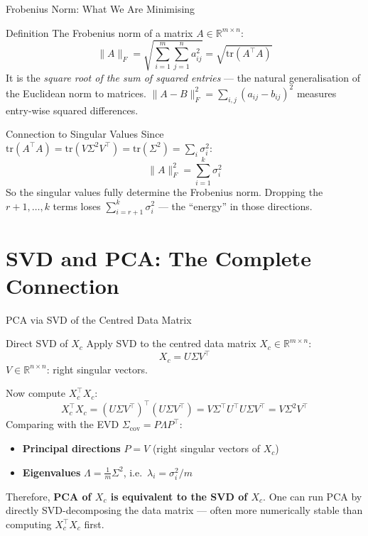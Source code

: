 \documentclass{beamer}
\begin{document}
\begin{frame}[shrink=10]{Frobenius Norm: What We Are Minimising}
  \begin{block}{Definition}
    The Frobenius norm of a matrix $A \in \mathbb{R}^{m \times n}$:
    \[
      \|A\|_F = \sqrt{\sum_{i=1}^m\sum_{j=1}^n a_{ij}^2}
              = \sqrt{\mathrm{tr}(A^\top A)}
    \]
    It is the \emph{square root of the sum of squared entries} ---
    the natural generalisation of the Euclidean norm to matrices.
    $\|A - B\|_F^2 = \sum_{i,j}(a_{ij} - b_{ij})^2$ measures
    entry-wise squared differences.
  \end{block}

  \begin{block}{Connection to Singular Values}
    Since $\mathrm{tr}(A^\top A) = \mathrm{tr}(V\Sigma^2 V^\top)
    = \mathrm{tr}(\Sigma^2) = \sum_i \sigma_i^2$:
    \[
      \|A\|_F^2 = \sum_{i=1}^k \sigma_i^2
    \]
    So the singular values fully determine the Frobenius norm.
    Dropping the $r+1,\ldots,k$ terms loses
    $\sum_{i=r+1}^k \sigma_i^2$ --- the ``energy'' in those directions.
  \end{block}
\end{frame}

\section{SVD and PCA: The Complete Connection}

\begin{frame}[shrink=10]{PCA via SVD of the Centred Data Matrix}
  \begin{block}{Direct SVD of $X_c$}
    Apply SVD to the centred data matrix $X_c \in \mathbb{R}^{m\times n}$:
    \[
      X_c = U\Sigma V^\top
    \]
    $V \in \mathbb{R}^{n \times n}$: right singular vectors.

    Now compute $X_c^\top X_c$:
    \[
      X_c^\top X_c
        = (U\Sigma V^\top)^\top(U\Sigma V^\top)
        = V\Sigma^\top U^\top U\Sigma V^\top
        = V\Sigma^2 V^\top
    \]
    Comparing with the EVD $\Sigma_{\mathrm{cov}} = P\Lambda P^\top$:
    \begin{itemize}\setlength\itemsep{4pt}
      \item \textbf{Principal directions} $P = V$ (right singular vectors of $X_c$)
      \item \textbf{Eigenvalues} $\Lambda = \frac{1}{m}\Sigma^2$,\quad
            i.e.\ $\lambda_i = \sigma_i^2/m$
    \end{itemize}
    Therefore, \textbf{PCA of $X_c$ is equivalent to the SVD of $X_c$}.
    One can run PCA by directly SVD-decomposing the data matrix ---
    often more numerically stable than computing $X_c^\top X_c$ first.
  \end{block}
\end{frame}
\end{document}
